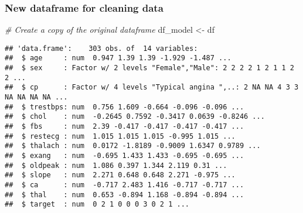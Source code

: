 \documentclass[
]{article}
\newenvironment{Shaded}{\begin{snugshade}}{\end{snugshade}}
\newcommand{\CommentTok}[1]{\textcolor[rgb]{0.56,0.35,0.01}{\textit{#1}}}
\newcommand{\FunctionTok}[1]{\textcolor[rgb]{0.13,0.29,0.53}{\textbf{#1}}}
\newcommand{\NormalTok}[1]{#1}
\newcommand{\OtherTok}[1]{\textcolor[rgb]{0.56,0.35,0.01}{#1}}
\newcommand{\SpecialCharTok}[1]{\textcolor[rgb]{0.81,0.36,0.00}{\textbf{#1}}}
\newcommand{\StringTok}[1]{\textcolor[rgb]{0.31,0.60,0.02}{#1}}
\begin{document}
\subsubsection{New dataframe for cleaning
data}\label{new-dataframe-for-cleaning-data}

\begin{Shaded}
\begin{Highlighting}[]
\CommentTok{\# Create a copy of the original dataframe}
\NormalTok{df\_model }\OtherTok{\textless{}{-}}\NormalTok{ df}
\end{Highlighting}
\end{Shaded}

\begin{Shaded}
\end{Shaded}

\begin{verbatim}
## 'data.frame':    303 obs. of  14 variables:
##  $ age     : num  0.947 1.39 1.39 -1.929 -1.487 ...
##  $ sex     : Factor w/ 2 levels "Female","Male": 2 2 2 2 1 2 1 1 2 2 ...
##  $ cp      : Factor w/ 4 levels "Typical angina ",..: 2 NA NA 4 3 3 NA NA NA NA ...
##  $ trestbps: num  0.756 1.609 -0.664 -0.096 -0.096 ...
##  $ chol    : num  -0.2645 0.7592 -0.3417 0.0639 -0.8246 ...
##  $ fbs     : num  2.39 -0.417 -0.417 -0.417 -0.417 ...
##  $ restecg : num  1.015 1.015 1.015 -0.995 1.015 ...
##  $ thalach : num  0.0172 -1.8189 -0.9009 1.6347 0.9789 ...
##  $ exang   : num  -0.695 1.433 1.433 -0.695 -0.695 ...
##  $ oldpeak : num  1.086 0.397 1.344 2.119 0.31 ...
##  $ slope   : num  2.271 0.648 0.648 2.271 -0.975 ...
##  $ ca      : num  -0.717 2.483 1.416 -0.717 -0.717 ...
##  $ thal    : num  0.653 -0.894 1.168 -0.894 -0.894 ...
##  $ target  : num  0 2 1 0 0 0 3 0 2 1 ...
\end{verbatim}
\end{document}
